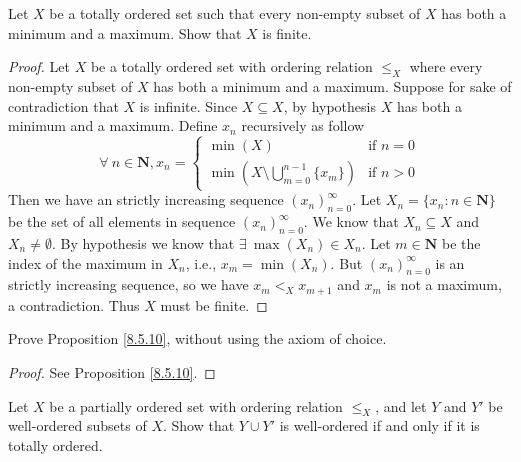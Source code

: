 \begin{exercise}\label{ex 8.5.9}
    Let \(X\) be a totally ordered set such that every non-empty subset of \(X\) has both a minimum and a maximum.
    Show that \(X\) is finite.
\end{exercise}

\begin{proof}
    Let \(X\) be a totally ordered set with ordering relation \(\leq_X\) where every non-empty subset of \(X\) has both a minimum and a maximum.
    Suppose for sake of contradiction that \(X\) is infinite.
    Since \(X \subseteq X\), by hypothesis \(X\) has both a minimum and a maximum.
    Define \(x_n\) recursively as follow
    \[
        \forall\ n \in \mathbf{N}, x_n = \begin{cases}
            \min(X)                                           & \text{if } n = 0 \\
            \min(X \setminus \bigcup_{m = 0}^{n - 1} \{x_m\}) & \text{if } n > 0
        \end{cases}
    \]
    Then we have an strictly increasing sequence \((x_n)_{n = 0}^\infty\).
    Let \(X_n = \{x_n : n \in \mathbf{N}\}\) be the set of all elements in sequence \((x_n)_{n = 0}^\infty\).
    We know that \(X_n \subseteq X\) and \(X_n \neq \emptyset\).
    By hypothesis we know that \(\exists\ \max(X_n) \in X_n\).
    Let \(m \in \mathbf{N}\) be the index of the maximum in \(X_n\), i.e., \(x_m = \min(X_n)\).
    But \((x_n)_{n = 0}^\infty\) is an strictly increasing sequence, so we have \(x_m <_X x_{m + 1}\) and \(x_m\) is not a maximum, a contradiction.
    Thus \(X\) must be finite.
\end{proof}

\begin{exercise}\label{ex 8.5.10}
    Prove Proposition \ref{8.5.10}, without using the axiom of choice.
\end{exercise}

\begin{proof}
    See Proposition \ref{8.5.10}.
\end{proof}

\begin{exercise}\label{ex 8.5.11}
    Let \(X\) be a partially ordered set with ordering relation \(\leq_X\), and let \(Y\) and \(Y'\) be well-ordered subsets of \(X\).
    Show that \(Y \cup Y'\) is well-ordered if and only if it is totally ordered.
\end{exercise}


